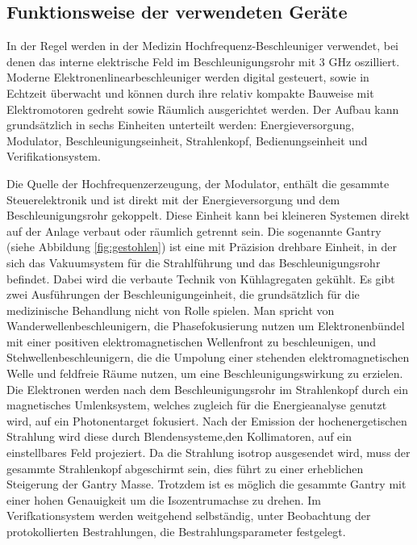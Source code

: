 





\subsection{Funktionsweise der verwendeten Geräte}
In der Regel werden in der Medizin Hochfrequenz-Beschleuniger verwendet, bei denen das interne elektrische Feld 
im Beschleunigungsrohr mit 3 GHz oszilliert. 
Moderne Elektronenlinearbeschleuniger werden digital gesteuert, sowie in Echtzeit überwacht und können durch ihre relativ kompakte Bauweise
mit Elektromotoren gedreht sowie Räumlich ausgerichtet werden.
Der Aufbau kann grundsätzlich in sechs Einheiten unterteilt werden: Energieversorgung, Modulator, Beschleunigungseinheit, Strahlenkopf, Bedienungseinheit und Verifikationsystem. \cite{KriegerHannoSfTu}


Die Quelle der Hochfrequenzerzeugung, der Modulator, enthält die gesammte Steuerelektronik und ist direkt mit der Energieversorgung und dem Beschleunigungsrohr gekoppelt.
Diese Einheit kann bei kleineren Systemen direkt auf der Anlage verbaut oder räumlich getrennt sein.
Die sogenannte Gantry (siehe Abbildung \ref{fig:gestohlen}) ist eine mit Präzision drehbare Einheit, in der sich das Vakuumsystem für die Strahlführung und das Beschleunigungsrohr befindet.
Dabei wird die verbaute Technik von Kühlagregaten gekühlt.
Es gibt zwei Ausführungen der Beschleunigungeinheit, die grundsätzlich für die medizinische Behandlung nicht von Rolle spielen.
Man spricht von Wanderwellenbeschleunigern, die Phasefokusierung nutzen um Elektronenbündel mit einer positiven elektromagnetischen Wellenfront zu beschleunigen,
und Stehwellenbeschleunigern, die die Umpolung einer stehenden elektromagnetischen Welle und feldfreie Räume nutzen, um eine Beschleunigungswirkung zu erzielen.
Die Elektronen werden nach dem Beschleunigungsrohr im Strahlenkopf durch ein magnetisches Umlenksystem, welches zugleich für die Energieanalyse genutzt wird, auf ein Photonentarget fokusiert.
Nach der Emission der hochenergetischen Strahlung wird diese durch Blendensysteme,den Kollimatoren, auf ein einstellbares Feld projeziert.
Da die Strahlung isotrop ausgesendet wird, muss der gesammte Strahlenkopf abgeschirmt sein, dies führt zu einer erheblichen Steigerung der Gantry Masse.
Trotzdem ist es möglich die gesammte Gantry mit einer hohen Genauigkeit um die Isozentrumachse zu drehen.
Im Verifkationsystem werden weitgehend selbständig, unter Beobachtung der protokollierten Bestrahlungen, die Bestrahlungsparameter festgelegt.\cite{KriegerHannoSfTu}

